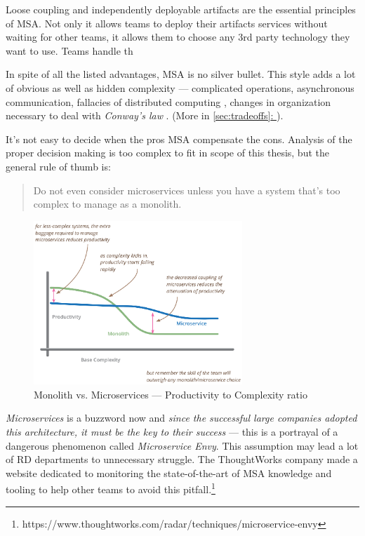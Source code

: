 \documentclass[thesis=M,english,hidelinks]{FITthesis}[2012/10/20]
\newcommand*{\fullref}[1]{\hyperref[{#1}]{\autoref*{#1}: \textit{\nameref*{#1}}}}
\begin{document}
Loose coupling and independently deployable artifacts are the essential principles of \acrshort{MSA}. Not only it allows teams to deploy their artifacts services without waiting for other teams, it allows them to choose any 3rd party technology they want to use. Teams handle th 

In spite of all the listed advantages, \acrlong{MSA} is no silver bullet. This style adds a lot of obvious as well as hidden complexity --- complicated operations, asynchronous communication, fallacies of distributed computing \cite{devops-fallacies}, changes in organization necessary to deal with \textit{Conway's law} \cite{conways-law}. (More in \fullref{sec:tradeoffs}).

It's not easy to decide when the pros \acrshort{MSA} compensate the cons. Analysis of the proper decision making is too complex to fit in scope of this thesis, but the general rule of thumb is:
\begin{quote}
    Do not even consider microservices unless you have a system that's too complex to manage as a monolith.~\cite{ms-fow-monolith-first}
\end{quote}

\begin{figure}
  \centering
    \includegraphics[width=0.7\textwidth]{images/microservices_productivity.png}
    \caption[Monolith vs. Microservices --- Productivity to Complexity ratio]{Monolith vs. Microservices --- Productivity to Complexity ratio~\cite{ms-fow-monolith-first}}
    \label{fig:microservices_productivity}
\end{figure}


\textit{Microservices} is a buzzword now and \textit{since the successful large companies adopted this architecture, it must be the key to their success} --- this is a portrayal of a dangerous phenomenon called \textit{Microservice Envy}. This assumption may lead a lot of \acrshort{RD} departments to unnecessary struggle. The ThoughtWorks company made a website dedicated to monitoring the state-of-the-art of \acrshort{MSA} knowledge and tooling to help other teams to avoid this pitfall.\footnote{https://www.thoughtworks.com/radar/techniques/microservice-envy}
\end{document}
